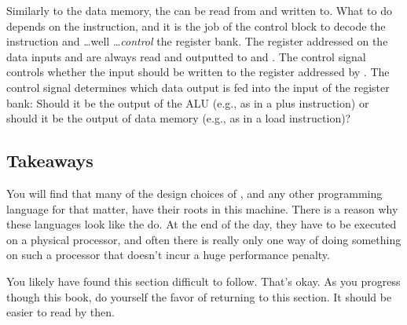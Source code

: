 Similarly to the data memory, the  can be read from and written to. What to do depends on the instruction, and it is the job of the control block to decode the instruction and \ldots well \ldots \textsl{control} the register bank. The register addressed on the data inputs  and  are always read and outputted to  and . The  control signal controls whether the  input should be written to the register addressed by . The  control signal determines which data output is fed into the  input of the register bank: Should it be the output of the ALU (e.g., as in a plus instruction) or should it be the output of data memory (e.g., as in a load instruction)?

\subsection{Takeaways}

You will find that many of the design choices of \csharp, and any other programming language for that matter, have their roots in this machine. There is a reason why these languages look like the do. At the end of the day, they have to be executed on a physical processor, and often there is really only one way of doing something on such a processor that doesn't incur a huge performance penalty.

You likely have found this section difficult to follow. That's okay. As you progress though this book, do yourself the favor of returning to this section. It should be easier to read by then.

